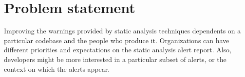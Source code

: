 
\section{Problem statement}\label{sec:problem-statement}





Improving the warnings provided by static analysis techniques dependents on a particular codebase and the people who produce it. Organizations can have different priorities and expectations on the static analysis alert report. Also, developers might be more interested in a particular subset of alerts, or the context on which the alerts appear.



